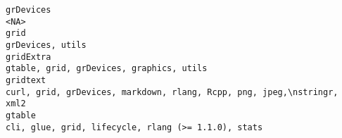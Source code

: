 \documentclass[
  letterpaper,
  DIV=11,
  numbers=noendperiod]{scrreprt}
\begin{document}
\begin{verbatim}
grDevices                                                                                                                                                                                                                                                                                                                                                                                                                                                                                                                                                                                                             <NA>
grid                                                                                                                                                                                                                                                                                                                                                                                                                                                                                                                                                                                                      grDevices, utils
gridExtra                                                                                                                                                                                                                                                                                                                                                                                                                                                                                                                                                                         gtable, grid, grDevices, graphics, utils
gridtext                                                                                                                                                                                                                                                                                                                                                                                                                                                                                                                                           curl, grid, grDevices, markdown, rlang, Rcpp, png, jpeg,\nstringr, xml2
gtable                                                                                                                                                                                                                                                                                                                                                                                                                                                                                                                                                                 cli, glue, grid, lifecycle, rlang (>= 1.1.0), stats

\end{verbatim}
\end{document}
